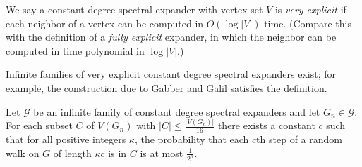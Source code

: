 \documentclass[]{article}
\begin{document}
\begin{definition}
  We say a constant degree spectral expander with vertex set $V$ is \emph{very explicit} if each neighbor of a vertex can be computed in $O(\log |V|)$ time.
  (Compare this with the definition of a \emph{fully explicit} expander, in which the neighbor can be computed in time polynomial in $\log |V|$.)
\end{definition}

Infinite families of very explicit constant degree spectral expanders exist; for example, the construction due to Gabber and Galil \cite{gg79} satisfies the definition.

\begin{lemma}\label{lem:expander}
  Let $\mathcal{G}$ be an infinite family of constant degree spectral expanders and let $G_n \in \mathcal{G}$.
  For each subset $C$ of $V(G_n)$ with $|C| \leq \frac{|V(G_n)|}{16}$ there exists a constant $c$ such that for all positive integers $\kappa$, the probability that each $c$th step of a random walk on $G$ of length $\kappa c$ is in $C$ is at most $\frac{1}{2^\kappa}$.
\end{lemma}
\end{document}
